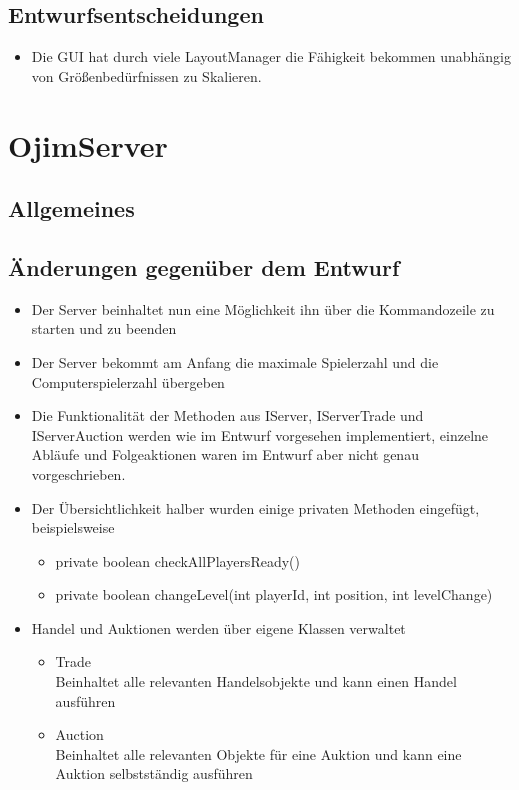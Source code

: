 \documentclass[a4paper,10pt]{article}
\begin{document}
\begin{itemize}
\subsection{Entwurfsentscheidungen}
\begin{itemize}
\item Die GUI hat durch viele LayoutManager die Fähigkeit bekommen unabhängig von Größenbedürfnissen zu Skalieren.
\end{itemize}
\newpage
\section{OjimServer}
\subsection{Allgemeines}
\subsection {Änderungen gegenüber dem Entwurf}
\begin{itemize}
\item Der Server beinhaltet nun eine Möglichkeit ihn über die Kommandozeile zu starten und zu beenden
\item Der Server bekommt am Anfang die maximale Spielerzahl und die Computerspielerzahl übergeben
\item Die Funktionalität der Methoden aus IServer, IServerTrade und IServerAuction werden wie im Entwurf vorgesehen implementiert, einzelne Abläufe und Folgeaktionen waren im Entwurf aber nicht genau vorgeschrieben.
\item Der Übersichtlichkeit halber wurden einige privaten Methoden eingefügt, beispielsweise
\begin{itemize}
\item private boolean checkAllPlayersReady()
\item private boolean changeLevel(int playerId, int position, int levelChange)
\end{itemize}
\item Handel und Auktionen werden über eigene Klassen verwaltet
\begin{itemize}
\item Trade \\ Beinhaltet alle relevanten Handelsobjekte und kann einen Handel ausführen
\item Auction \\ Beinhaltet alle relevanten Objekte für eine Auktion und kann eine Auktion selbstständig ausführen

\end{itemize}
\end{itemize}
\end{itemize}
\end{document}
